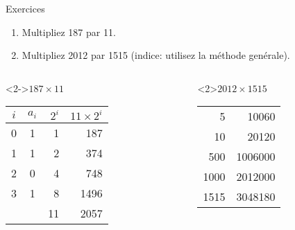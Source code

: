 \begin{frame}{Exercices}
  
  \begin{enumerate}
  \item Multipliez 187 par 11.
  \item Multipliez 2012 par 1515 (indice: utilisez la méthode genérale).
  \end{enumerate}
\begin{columns}
\begin{column}[t]{0.48\textwidth}
  \begin{exampleblock}<2->{$187\times 11$}
    \begin{tabular}{c|c|r|r}
        $i$ & $a_i$ & $2^i$ & $11 \times 2^i$ \\
        \hline
        0& 1 & 1 & 187\\
        1& 1 & 2 & 374\\
        2& 0 & 4 & 748\\
        3& 1 & 8 & 1496\\ \hline
        &  & 11 &2057
      \end{tabular}    
  \end{exampleblock}
\end{column}
\begin{column}[t]{0.48\textwidth}
    \begin{exampleblock}<2>{$2012\times 1515$}
      \begin{tabular}{r|r}
        5& 10060 \\
        10& 20120 \\
        500 & 1006000 \\
        1000 & 2012000\\ \hline
        1515 & 3048180 
      \end{tabular}
  \end{exampleblock}
\end{column}
\end{columns}

\end{frame}


